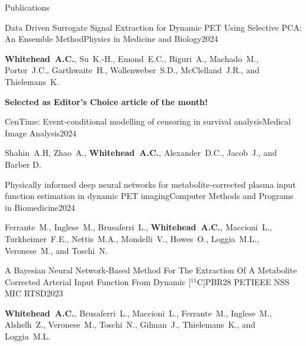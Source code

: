 \documentclass{cv}
\begin{document}
\begin{spacing}{1.0}
\begin{rSection}{Publications}
            \item \begin{rSubsection}{Data Driven Surrogate Signal Extraction for Dynamic PET Using Selective PCA: An Ensemble Method}{}{Physics in Medicine and Biology}{2024}
                \item \textbf{Whitehead~A.C.}, Su~K.-H., Emond~E.C., Biguri~A., Machado~M., Porter~J.C., Garthwaite~H., Wollenweber~S.D., McClelland~J.R., and Thielemans~K. \\
                \vspace{-0.5cm}
                \item \textbf{Selected as Editor’s Choice article of the month!} \\
            \end{rSubsection}
            
            \item \begin{rSubsection}{CenTime: Event-conditional modelling of censoring in survival analysis}{}{Medical Image Analysis}{2024}
                \item Shahin~A.H, Zhao~A., \textbf{Whitehead~A.C.}, Alexander~D.C., Jacob~J., and Barber D.
            \end{rSubsection}
    
            \item \begin{rSubsection}{Physically informed deep neural networks for metabolite-corrected plasma input function estimation in dynamic PET imaging}{}{Computer Methods and Programs in Biomedicine}{2024}
                \item Ferrante~M., Inglese~M., Brusaferri~L., \textbf{Whitehead~A.C.}, Maccioni~L., Turkheimer~F.E., Nettis~M.A., Mondelli~V., Howes~O., Loggia~M.L., Veronese~M., and Toschi~N.
            \end{rSubsection}
    
            \item \begin{rSubsection}{A Bayesian Neural Network-Based Method For The Extraction Of A Metabolite Corrected Arterial Input Function From Dynamic [$^{11}$C]PBR28 PET}{}{IEEE NSS MIC RTSD}{2023}
                \item \textbf{Whitehead~A.C.}, Brusaferri~L., Maccioni~L., Ferrante~M., Inglese~M., Alshelh~Z., Veronese~M., Toschi~N., Gilman~J., Thielemans~K., and Loggia~M.L.
            \end{rSubsection}
    

\end{rSection}
\end{spacing}
\end{document}
